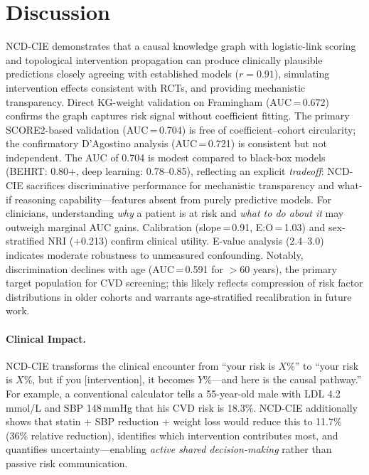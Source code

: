 \documentclass[runningheads]{llncs}
\begin{document}
\section{Discussion}\label{sec:discussion}

NCD-CIE demonstrates that a causal knowledge graph with logistic-link
scoring and topological intervention propagation can produce
clinically plausible predictions closely agreeing with established
models ($r = 0.91$), simulating intervention effects consistent with
RCTs, and providing mechanistic transparency.
Direct KG-weight validation on Framingham (AUC\,=\,0.672) confirms
the graph captures risk signal without coefficient fitting.
The primary SCORE2-based validation (AUC\,=\,0.704) is free of
coefficient--cohort circularity; the confirmatory D'Agostino analysis
(AUC\,=\,0.721) is consistent but not independent.
The AUC of 0.704 is modest compared to black-box models
(BEHRT: 0.80+, deep learning: 0.78--0.85), reflecting an explicit
\emph{tradeoff}: NCD-CIE sacrifices discriminative performance for
mechanistic transparency and what-if reasoning capability---features
absent from purely predictive models.
For clinicians, understanding \emph{why} a patient is at risk and
\emph{what to do about it} may outweigh marginal AUC gains.
Calibration (slope\,=\,0.91, E:O\,=\,1.03) and sex-stratified
NRI ($+$0.213) confirm clinical utility.
E-value analysis (2.4--3.0) indicates moderate robustness to
unmeasured confounding.
Notably, discrimination declines with age (AUC\,=\,0.591 for
$>$60 years), the primary target population for CVD screening;
this likely reflects compression of risk factor distributions
in older cohorts and warrants age-stratified recalibration in
future work.

\paragraph{Clinical Impact.}
NCD-CIE transforms the clinical encounter from ``your risk is
$X$\%'' to ``your risk is $X$\%, but if you [intervention], it
becomes $Y$\%---and here is the causal pathway.''
For example, a conventional calculator tells a 55-year-old male
with LDL 4.2\,mmol/L and SBP 148\,mmHg that his CVD risk is
18.3\%.
NCD-CIE additionally shows that statin + SBP reduction + weight
loss would reduce this to 11.7\% (36\% relative reduction),
identifies which intervention contributes most, and quantifies
uncertainty---enabling \emph{active shared decision-making} rather
than passive risk communication.
\end{document}
